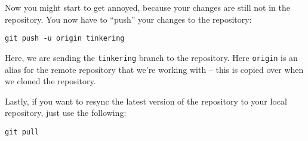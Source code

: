 \documentclass[11pt, oneside]{article}   	%
\begin{document}
Now you might start to get annoyed, because your changes are still not in the repository. You now have to ``push'' your changes to the repository:

\begin{lstlisting} 
git push -u origin tinkering
\end{lstlisting}
Here, we are sending the \texttt{tinkering} branch to the repository. Here \texttt{origin} is an alias for the remote repository that we're working with -- this is copied over when we cloned the repository.

Lastly, if you want to resync the latest version of the repository to your local repository, just use the following:
\begin{lstlisting}
git pull
\end{lstlisting}
\end{document}
